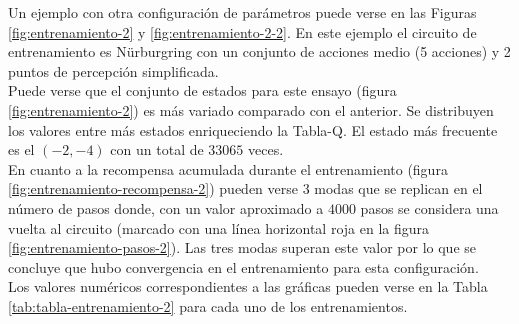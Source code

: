 Un ejemplo con otra configuración de parámetros puede verse en las Figuras \ref{fig:entrenamiento-2} y \ref{fig:entrenamiento-2-2}. En este ejemplo el circuito de entrenamiento es Nürburgring con un conjunto de acciones medio (5 acciones) y 2 puntos de percepción simplificada.\\

Puede verse que el conjunto de estados para este ensayo (figura \ref{fig:entrenamiento-2}) es más variado comparado con el anterior. Se distribuyen los valores entre más estados enriqueciendo la Tabla-Q. El estado más frecuente es el $(-2, -4)$ con un total de $33065$ veces.\\

En cuanto a la recompensa acumulada durante el entrenamiento (figura \ref{fig:entrenamiento-recompensa-2}) pueden verse 3 modas que se replican en el número de pasos donde, con un valor aproximado a $4000$ pasos se considera una vuelta al circuito (marcado con una línea horizontal roja en la figura \ref{fig:entrenamiento-pasos-2}). Las tres modas superan este valor por lo que se concluye que hubo convergencia en el entrenamiento para esta configuración.\\

Los valores numéricos correspondientes a las gráficas pueden verse en la Tabla \ref{tab:tabla-entrenamiento-2} para cada uno de los entrenamientos.

